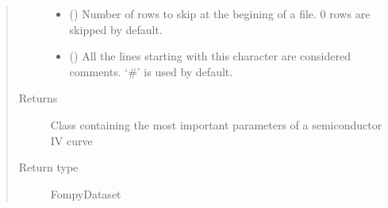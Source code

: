 \documentclass[letterpaper,10pt,english,openany, oneside]{sphinxmanual}
\begin{document}
\begin{fulllineitems}
\begin{quote}
\begin{description}
\begin{itemize}
\item {} 
 () \textendash{} Number of rows to skip at the begining of a file. 0 rows are skipped by default.

\item {} 
 () \textendash{} All the lines starting with this character are considered comments.
‘\#’ is used by default.

\end{itemize}

\item[{Returns}] \leavevmode
Class containing the most important parameters of a semiconductor IV curve

\item[{Return type}] \leavevmode
FompyDataset

\end{description}\end{quote}

\end{fulllineitems}

\end{document}
